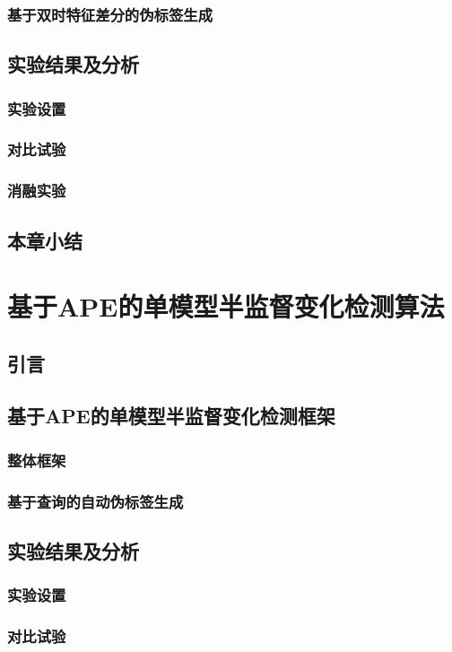 \documentclass[lang=chs, degree=master, blindreview=false, adobe=false]{yanputhesis}
\begin{document}
\subsection{基于双时特征差分的伪标签生成}
\section{实验结果及分析}
\subsection{实验设置}
\subsection{对比试验}
\subsection{消融实验}
\section{本章小结}

\chapter{基于APE的单模型半监督变化检测算法}
\section{引言}
\section{基于APE的单模型半监督变化检测框架}
\subsection{整体框架}
\subsection{基于查询的自动伪标签生成}
\section{实验结果及分析}
\subsection{实验设置}
\subsection{对比试验}
\end{document}
